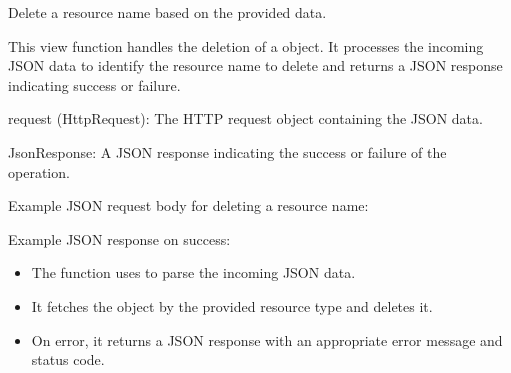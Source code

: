 \documentclass[letterpaper,10pt,english]{sphinxmanual}
\begin{document}

\begin{fulllineitems}
\label{\detokenize{app:app.views.delete_name}}
\pysigstartsignatures
{}
\pysigstopsignatures
\sphinxAtStartPar
Delete a resource name based on the provided data.

\sphinxAtStartPar
This view function handles the deletion of a  object. 
It processes the incoming JSON data to identify the resource name to delete and 
returns a JSON response indicating success or failure.
\begin{description}
\sphinxAtStartPar
request (HttpRequest): The HTTP request object containing the JSON data.

\sphinxAtStartPar
JsonResponse: A JSON response indicating the success or failure of the operation.

\sphinxAtStartPar
Example JSON request body for deleting a resource name:

\begin{sphinxVerbatim}[commandchars=\\\{\}]
\end{sphinxVerbatim}

\sphinxAtStartPar
Example JSON response on success:

\begin{sphinxVerbatim}[commandchars=\\\{\}]
\end{sphinxVerbatim}

\begin{itemize}
\item {} 
\sphinxAtStartPar
The function uses  to parse the incoming JSON data.

\item {} 
\sphinxAtStartPar
It fetches the  object by the provided resource type and deletes it.

\item {} 
\sphinxAtStartPar
On error, it returns a JSON response with an appropriate error message and status code.

\end{itemize}

\end{description}

\end{fulllineitems}
\end{document}
